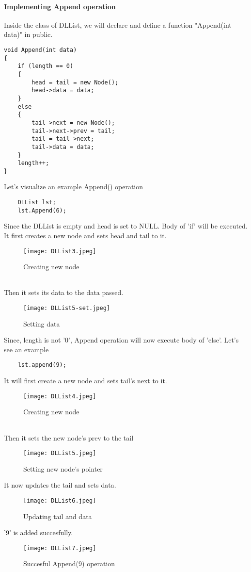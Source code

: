 \documentclass[11pt,fleqn]{book} %
\begin{document}
\paragraph{Implementing Append operation}
Inside the class of DLList, we will declare and define a function "Append(int data)" in public.
\begin{lstlisting}
void Append(int data)
{
	if (length == 0)
	{
		head = tail = new Node();
		head->data = data;
	}
	else
	{
		tail->next = new Node();
		tail->next->prev = tail;
		tail = tail->next;
		tail->data = data;
	}
	length++;
}

\end{lstlisting}
\begin{example}
	Let's visualize an example Append() operation\\
	\begin{lstlisting}
	DLList lst;
	lst.Append(6);
	\end{lstlisting}
	Since the DLList is empty and head is set to NULL. Body of 'if' will be executed.\\
	It first creates a new node and sets head and tail to it.\\
	\begin{figure}[H]
		\centering
		\texttt{[image: DLList3.jpeg]}
		\caption{Creating new node}
	\end{figure}
	~\\
	Then it sets its data to the data passed.
	\begin{figure}[H]
		\centering
		\texttt{[image: DLList5-set.jpeg]}
		\caption{Setting data}
	\end{figure}
\end{example}
Since, length is not '0', Append operation will now execute body of 'else'. Let's see an example
\begin{example}
	\begin{lstlisting}
	lst.append(9);
	\end{lstlisting}
	It will first create a new node and sets tail's next to it.
	\begin{figure}[H]
		\centering
		\texttt{[image: DLList4.jpeg]}
		\caption{Creating new node}
	\end{figure} ~\\
	Then it sets the new node's prev to the tail
	\begin{figure}[H]
		\centering
		\texttt{[image: DLList5.jpeg]}
		\caption{Setting new node's pointer}
	\end{figure}
	It now updates the tail and sets data.
	\begin{figure}[H]
		\centering
		\texttt{[image: DLList6.jpeg]}
		\caption{Updating tail and data}
	\end{figure}
		'9' is added succesfully.
	{\begin{figure}[H]
			\centering
			\texttt{[image: DLList7.jpeg]}
			\caption{Succesful Append(9) operation}
	\end{figure}}
\end{example}
\end{document}
